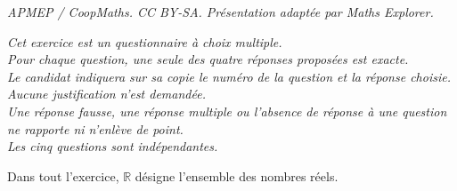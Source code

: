 \documentclass[10pt]{article}
\providecommand{\R}{\mathbb{R}}
\begin{document}
\noindent\textit{APMEP / CoopMaths. CC BY-SA. Présentation adaptée par Maths Explorer.}\par\medskip
\medskip

\emph{Cet exercice est un questionnaire à choix multiple.\\
Pour chaque question, une seule des quatre réponses proposées est exacte.\\
Le candidat indiquera sur sa copie le numéro de la question et la réponse choisie.\\
Aucune justification n'est demandée.\\
Une réponse fausse, une réponse multiple ou l'absence de réponse à une question ne rapporte ni n'enlève de point.\\
Les cinq questions sont indépendantes.}

\bigskip

Dans tout l'exercice, $\R$ désigne l'ensemble des nombres réels.

\medskip
\end{document}
